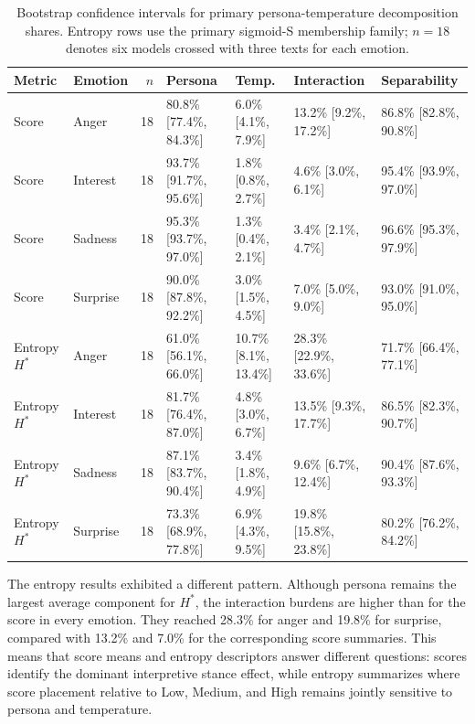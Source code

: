 \documentclass[conference]{IEEEtran}
\begin{document}
\begin{table}[t]
\centering
\caption{Bootstrap confidence intervals for primary persona-temperature decomposition shares. Entropy rows use the primary sigmoid-S membership family; $n=18$ denotes six models crossed with three texts for each emotion.}
\label{tab:scis-bootstrap-ci}
\begin{tabular}{llrllll}
\hline
Metric & Emotion & $n$ & Persona & Temp. & Interaction & Separability \\
\hline
Score & Anger & 18 & 80.8\% [77.4\%, 84.3\%] & 6.0\% [4.1\%, 7.9\%] & 13.2\% [9.2\%, 17.2\%] & 86.8\% [82.8\%, 90.8\%] \\
Score & Interest & 18 & 93.7\% [91.7\%, 95.6\%] & 1.8\% [0.8\%, 2.7\%] & 4.6\% [3.0\%, 6.1\%] & 95.4\% [93.9\%, 97.0\%] \\
Score & Sadness & 18 & 95.3\% [93.7\%, 97.0\%] & 1.3\% [0.4\%, 2.1\%] & 3.4\% [2.1\%, 4.7\%] & 96.6\% [95.3\%, 97.9\%] \\
Score & Surprise & 18 & 90.0\% [87.8\%, 92.2\%] & 3.0\% [1.5\%, 4.5\%] & 7.0\% [5.0\%, 9.0\%] & 93.0\% [91.0\%, 95.0\%] \\
Entropy $H^*$ & Anger & 18 & 61.0\% [56.1\%, 66.0\%] & 10.7\% [8.1\%, 13.4\%] & 28.3\% [22.9\%, 33.6\%] & 71.7\% [66.4\%, 77.1\%] \\
Entropy $H^*$ & Interest & 18 & 81.7\% [76.4\%, 87.0\%] & 4.8\% [3.0\%, 6.7\%] & 13.5\% [9.3\%, 17.7\%] & 86.5\% [82.3\%, 90.7\%] \\
Entropy $H^*$ & Sadness & 18 & 87.1\% [83.7\%, 90.4\%] & 3.4\% [1.8\%, 4.9\%] & 9.6\% [6.7\%, 12.4\%] & 90.4\% [87.6\%, 93.3\%] \\
Entropy $H^*$ & Surprise & 18 & 73.3\% [68.9\%, 77.8\%] & 6.9\% [4.3\%, 9.5\%] & 19.8\% [15.8\%, 23.8\%] & 80.2\% [76.2\%, 84.2\%] \\
\hline
\end{tabular}
\end{table}

The entropy results exhibited a different pattern.
Although persona remains the largest average component for $H^*$, the interaction burdens are higher than for the score in every emotion.
They reached 28.3\% for anger and 19.8\% for surprise, compared with 13.2\% and 7.0\% for the corresponding score summaries.
This means that score means and entropy descriptors answer different questions: scores identify the dominant interpretive stance effect, while entropy summarizes where score placement relative to Low, Medium, and High remains jointly sensitive to persona and temperature.
\end{document}
